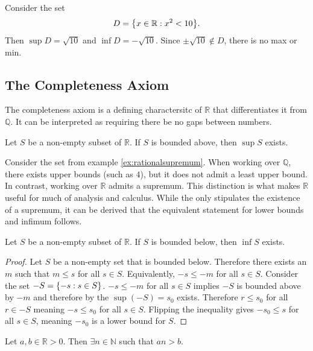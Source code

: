 \documentclass[../notes.tex]{subfiles}
\begin{document}
\begin{example}
	Consider the set
	\[
		D = \qty{x \in \mathbb{R} : x^2 < 10}
	.\]
	Then $\sup D = \sqrt{10}$ and $\inf D = -\sqrt{10}$. Since $\pm \sqrt{10} \notin D$, there is no max or min.
\end{example}

\subsection{The Completeness Axiom}

The completeness axiom is a defining charactersitc of $\mathbb{R}$ that differentiates it from $\mathbb{Q}$. It can be interpreted as requiring there be no gaps between numbers.

\begin{definition}
	\label{def:axiomofcompleteness}
	Let $S$ be a non-empty subset of $\mathbb{R}$. If $S$ is bounded above, then $\sup S$ exists.
\end{definition}

Consider the set from example \ref{ex:rationalsupremum}. When working over $\mathbb{Q}$, there exists upper bounds (such as $4$), but it does not admit a least upper bound. In contrast, working over $\mathbb{R}$ admits a supremum. This distinction is what makes $\mathbb{R}$ useful for much of analysis and calculus. While the  only stipulates the existence of a supremum, it can be derived that the equivalent statement for lower bounds and infimum follows.

\begin{corollary}
	Let $S$ be a non-empty subset of $\mathbb{R}$. If $S$ is bounded below, then $\inf S$ exists.
\end{corollary}
\begin{proof}
	Let $S$ be a non-empty set that is bounded below. Therefore there exists an $m$ such that $m \leq s$ for all $s \in S$. Equivalently, $-s \leq -m$ for all $s \in S$. Consider the set $-S = \qty{-s : s \in S}$. $-s \leq -m$ for all $s \in S$ implies $-S$ is bounded above by $-m$ and therefore by the  $\sup(-S) = s_0$ exists. Therefore $r \leq s_0$ for all $r \in -S$ meaning $-s \leq s_0$ for all $s \in S$. Flipping the inequality gives $-s_0 \leq s$ for all $s \in S$, meaning $-s_0$ is a lower bound for $S$.
\end{proof}

\begin{theorem}
	Let $a,b \in \mathbb{R} > 0$. Then $\exists n \in \mathbb{N}$ such that $an > b$.
\end{theorem}
\end{document}
